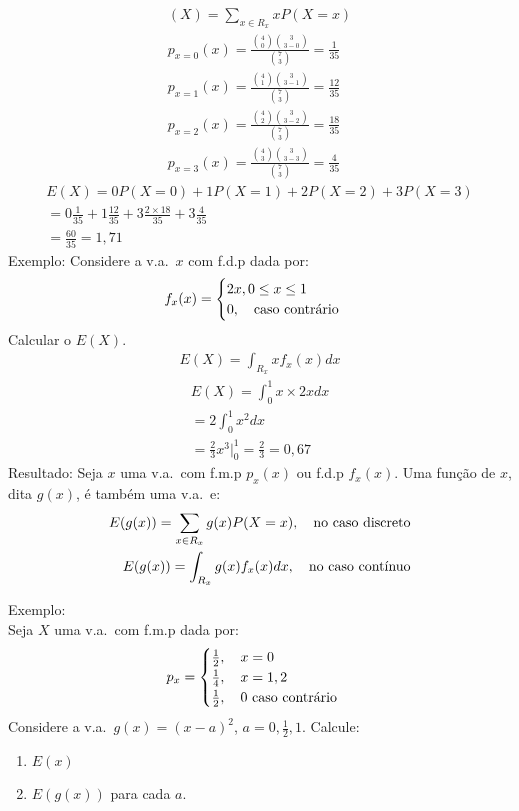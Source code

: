 \documentclass[11pt,a4paper]{book}
\begin{document}
\begin{enumerate}[label=(\alph*)]
\begin{enumerate}
\begin{align}
  (X)=\sum_{x \in R_{x}} x P(X=x)\\
  p_{x=0}(x)=\frac{\binom{4}{0}\binom{3}{3-0}}{\binom{7}{3}}=\frac{1}{35}\\
  p_{x=1}(x)=\frac{\binom{4}{1}\binom{3}{3-1}}{\binom{7}{3}}=\frac{12}{35}\\
  p_{x=2}(x)=\frac{\binom{4}{2}\binom{3}{3-2}}{\binom{7}{3}}=\frac{18}{35}\\
  p_{x=3}(x)=\frac{\binom{4}{3}\binom{3}{3-3}}{\binom{7}{3}}=\frac{4}{35}
\end{align}
\begin{align}
  E(X)=0 P(X=0)+1 P(X=1)+2 P(X=2)+3 P(X=3)\\
  =0 \frac{1}{35}+1 \frac{12}{35}+3 \frac{2\times 18}{35}+ 3 \frac{4}{35}\\
  =\frac{60}{35}=1,71
\end{align}
Exemplo: Considere a v.a.\ $x$ com f.d.p dada por: 
\begin{align}
  f_{x}(x)=\begin{cases}
    2x, 0\le x \le 1 \\
    0, \text{\quad caso contrário}
  \end{cases}
\end{align}
Calcular o $E(X)$.
\begin{align}
  E(X)=\int_{R_{x}} x f_{x}(x)dx
\end{align}
\begin{align}
  E(X)=\int_{0}^{1} x\times 2xdx\\
  = 2 \int_{0}^{1} x^{2}dx \\
  = \frac{2}{3} x^{3} |^1_0 = \frac{2}{3}=0,67
\end{align}
Resultado: Seja $x$ uma v.a.\ com f.m.p $p_{x}(x)$ ou f.d.p $f_{x}(x)$. Uma função
de $x$, dita $g(x)$, é também uma v.a.\ e: 
\begin{align}
  E(g(x))=\sum_{x \in R_{x}} g(x)P(X=x), \text{\quad no caso discreto}\\
  E(g(x))=\int_{R_{x}} g(x)f_{x}(x)dx, \text{\quad no caso contínuo}
\end{align}

Exemplo:\\ Seja $X$ uma v.a.\ com f.m.p dada por: 
\begin{align}
  p_{x}=\begin{cases}
    \frac{1}{2}, \text{\quad} x=0\\
    \frac{1}{4}, \text{\quad}x=1,2\\
    \frac{1}{2}, \text{\quad 0 caso contrário}
  \end{cases}
\end{align}
Considere a v.a.\ $g(x)={(x-a)}^2$, $a=0,\frac{1}{2},1$. Calcule: 
\begin{enumerate}[label=(\alph*)]
  \item $E(x)$
  \item $E(g(x))$ para cada $a$.
\end{enumerate}


\end{enumerate}
\end{enumerate}
\end{document}
